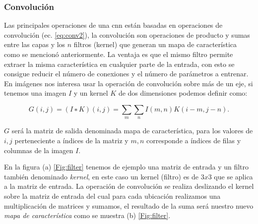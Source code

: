 \subsubsection{Convolución}\label{sub:convolucion}
Las principales operaciones de una \ac{cnn} están basadas en operaciones de convolución (ec. \eqref{eq:conv2}), la convolución son operaciones de producto y sumas entre las capas y los $n$ filtros (kernel) que generan  un mapa de característica como se mencionó anteriormente. La ventaja es que el mismo filtro permite extraer la misma característica en cualquier parte de la entrada, con esto se consigue reducir el número de conexiones y el número de parámetros a entrenar. En imágenes nos interesa usar la operación de convolución sobre más de un eje,  si tenemos una imagen $I$ y un kernel $K$ de dos dimensiones podemos definir como:

\begin{equation}\label{eq:conv2}
    G(i, j) = (I ∗ K)(i, j) = \sum_{m} \sum_{n} I(m, n) K(i - m, j - n).
\end{equation} 

$G$ será la matriz de salida denominada mapa de característica, para los valores de $i, j$ perteneciente a índices  de la matriz y $m, n$ corresponde a índices de filas y columnas de la imagen $I$.



En la figura (a) \ref{Fig:filter} tenemos de ejemplo una matriz de entrada y un filtro también denominado \textit{kernel}, en este caso un kernel (filtro) es de $3x3$ que se aplica a la matriz de entrada. La operación de convolución se realiza deslizando el kernel sobre la matriz de entrada del cual para cada ubicación realizamos una multiplicación de matrices y sumamos, el resultado de la suma será nuestro nuevo \textit{mapa de característica} como se muestra (b) \ref{Fig:filter}.

